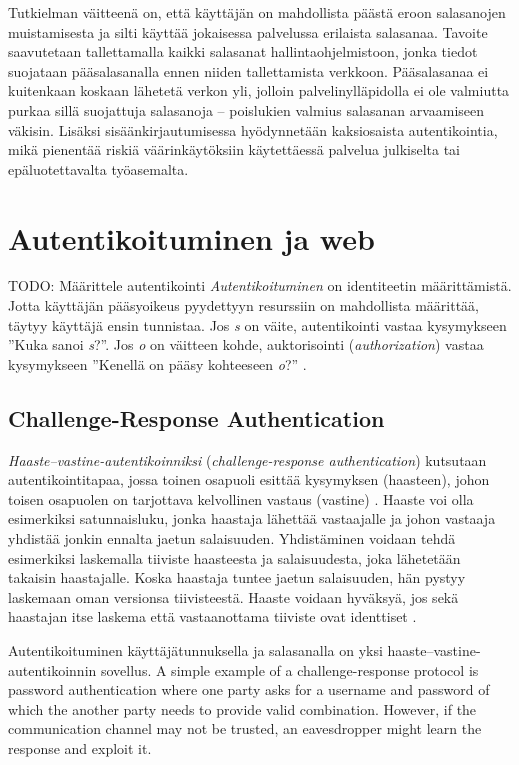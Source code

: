 \documentclass[english,gradu]{tktltiki}
\begin{document}
Tutkielman väitteenä on, että käyttäjän on mahdollista päästä eroon salasanojen muistamisesta ja silti käyttää jokaisessa palvelussa erilaista salasanaa. Tavoite saavutetaan tallettamalla kaikki salasanat hallintaohjelmistoon, jonka tiedot suojataan pääsalasanalla ennen niiden tallettamista verkkoon. Pääsalasanaa ei kuitenkaan koskaan lähetetä verkon yli, jolloin palvelinylläpidolla ei ole valmiutta purkaa sillä suojattuja salasanoja -- poislukien valmius salasanan arvaamiseen väkisin. Lisäksi sisäänkirjautumisessa hyödynnetään kaksiosaista autentikointia, mikä pienentää riskiä väärinkäytöksiin käytettäessä palvelua julkiselta tai epäluotettavalta työasemalta.


\section{Autentikoituminen ja web}

TODO: Määrittele autentikointi
\emph{Autentikoituminen} on identiteetin määrittämistä.
Jotta käyttäjän pääsyoikeus pyydettyyn resurssiin on mahdollista määrittää, täytyy käyttäjä ensin tunnistaa.
Jos \emph{s} on väite, autentikointi vastaa kysymykseen ''Kuka sanoi \emph{s}?''.
Jos \emph{o} on väitteen kohde, auktorisointi (\emph{authorization}) vastaa kysymykseen ''Kenellä on pääsy kohteeseen \emph{o}?'' \cite{lampson_distributed_1992}.



\subsection{Challenge-Response Authentication}

\emph{Haaste--vastine-autentikoinniksi} (\emph{challenge-response authentication}) kutsutaan autentikointitapaa, jossa toinen osapuoli esittää kysymyksen (haasteen), johon toisen osapuolen on tarjottava kelvollinen vastaus (vastine) \cite{NIST_SP800-63}. Haaste voi olla esimerkiksi satunnaisluku, jonka haastaja lähettää vastaajalle ja johon vastaaja yhdistää jonkin ennalta jaetun salaisuuden. Yhdistäminen voidaan tehdä esimerkiksi laskemalla tiiviste haasteesta ja salaisuudesta, joka lähetetään takaisin haastajalle. Koska haastaja tuntee jaetun salaisuuden, hän pystyy laskemaan oman versionsa tiivisteestä. Haaste voidaan hyväksyä, jos sekä haastajan itse laskema että vastaanottama tiiviste ovat identtiset \cite{NIST_SP800-63}.

Autentikoituminen käyttäjätunnuksella ja salasanalla on yksi haaste--vastine-autentikoinnin sovellus.
A simple example of a challenge-response protocol is password authentication where one party asks for a username and password of which the another party needs to provide valid combination. However, if the communication channel may not be trusted, an eavesdropper might learn the response and exploit it.
\end{document}
